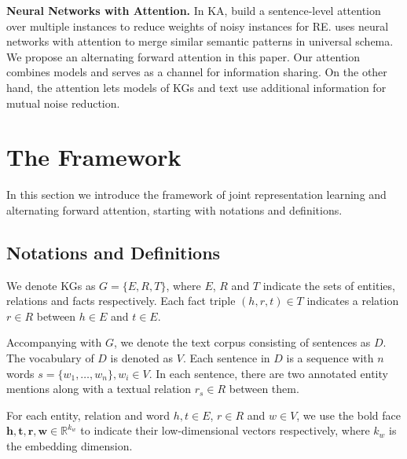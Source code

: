 \documentclass[letterpaper]{article} %
\begin{document}

\textbf{Neural Networks with Attention.} In KA, \cite{lin2016neural,luo-EtAl:2017:Long} build a sentence-level attention over multiple instances to reduce weights of noisy instances for RE. \cite{vergamccallum} uses neural networks with attention to merge similar semantic patterns in universal schema. We propose an alternating forward attention in this paper. Our attention combines models and serves as a channel for information sharing. On the other hand, the attention lets models of KGs and text use additional information for mutual noise reduction. 

\section{The Framework}
\label{sec:framework}

In this section we introduce the framework of joint representation learning and alternating forward attention, starting with notations and definitions.

\subsection{Notations and Definitions}

We denote KGs as $G = \{E, R, T\}$, where $E$, $R$ and $T$ indicate the sets of entities, relations and facts respectively. Each fact triple $(h, r, t) \in T$ indicates a relation $r \in R$ between $h \in E$ and $t \in E$.

Accompanying with $G$, we denote the text corpus consisting of sentences as $D$. The vocabulary of $D$ is denoted as $V$. Each sentence in $D$ is a sequence with $n$ words $s = \{w_1, \ldots, w_n\}, w_i \in V$. In each sentence, there are two annotated entity mentions along with a textual relation $r_s \in R$ between them. 

For each entity, relation and word $h, t \in E$, $r \in R$ and $w \in V$, we use the bold face $\mathbf{h}, \mathbf{t}, \mathbf{r}, \mathbf{w} \in \mathbb{R}^{k_w}$ to indicate their low-dimensional vectors respectively, where $k_w$ is the embedding dimension.

\end{document}
